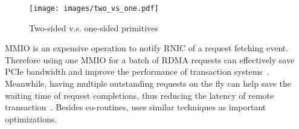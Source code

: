 \setlength{\intextsep}{2pt}%
\setlength{\columnsep}{8pt}%
\begin{wrapfigure}[8]{r}{.55\linewidth}
    \centering
    \vspace{-0.2cm}
    \texttt{[image: images/two\_vs\_one.pdf]}
    \vspace{-1cm}
    \caption{Two-sided v.s. one-sided primitives}
    \vspace{-0.4cm}
    \label{fig:two-vs-one-primitives}
\end{wrapfigure}
MMIO is an expensive operation to notify RNIC of a request fetching event. Therefore using one MMIO for a batch of RDMA requests can effectively save PCIe bandwidth and improve the performance of transaction systems~\cite{wei2018deconstructing}. Meanwhile, having multiple outstanding  requests on the fly can help save the waiting time of request completions, thus reducing the latency of remote transaction~\cite{wei2018deconstructing}. Besides co-routines, \projectname uses similar techniques as important optimizations.